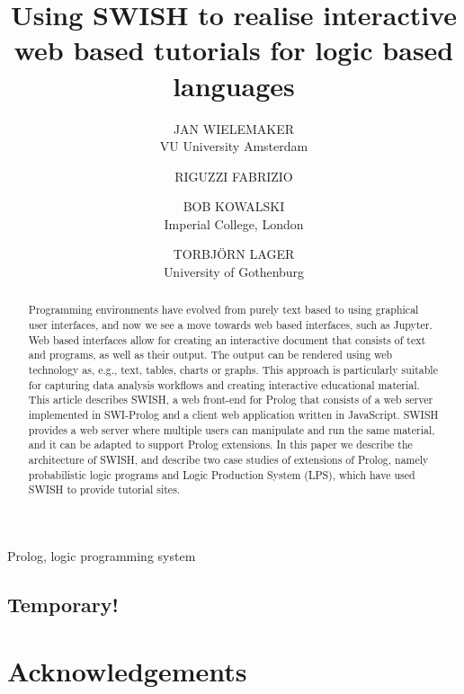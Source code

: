 \documentclass{tlp}
\begin{document}


\title{Using SWISH to realise interactive web based tutorials for
       logic based languages}

\author[J. Wielemaker et al.]
{JAN WIELEMAKER \\
VU University Amsterdam\\
\and
RIGUZZI FABRIZIO \\
\and
BOB KOWALSKI \\
Imperial College, London\\
\and
TORBJ\"ORN LAGER \\
University of Gothenburg\\
}

\pagerange{\pageref{firstpage}--\pageref{lastpage}}
\setcounter{page}{1}

\maketitle
\begin{abstract}
Programming environments have evolved from purely text based to using
graphical user interfaces, and now we see a move towards web based
interfaces, such as Jupyter. Web based interfaces allow for creating an
interactive document that consists of text and programs, as well as
their output. The output can be rendered using web technology as, e.g.,
text, tables, charts or graphs. This approach is particularly suitable
for capturing data analysis workflows and creating interactive
educational material. This article describes SWISH, a web front-end for
Prolog that consists of a web server implemented in SWI-Prolog and a
client web application written in JavaScript. SWISH provides a web
server where multiple users can manipulate and run the same material,
and it can be adapted to support Prolog extensions. In this paper we
describe the architecture of SWISH, and describe two case studies of
extensions of Prolog, namely probabilistic logic programs and Logic
Production System (LPS), which have used SWISH to provide tutorial
sites.
\end{abstract}


\begin{keywords}
Prolog, logic programming system
\end{keywords}

\newpage
\subsection*{Temporary!}
\tableofcontents
\newpage








\section*{Acknowledgements}


\end{document}
